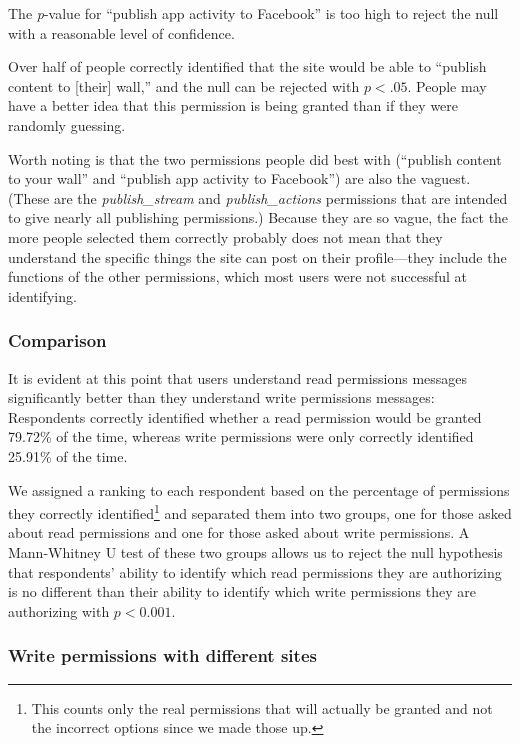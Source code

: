 \documentclass[10pt]{sig-alternate-10pt}
\begin{document}
The \emph{p}-value for ``publish app activity to Facebook'' is too high to reject the null with a reasonable level of confidence. 

Over half of people correctly identified that the site would be able to ``publish content to [their] wall,'' and the null can be rejected with $p < .05$. People may have a better idea that this permission is being granted than if they were randomly guessing. 

Worth noting is that the two permissions people did best with (``publish content to your wall'' and ``publish app activity to Facebook'') are also the vaguest. (These are the \emph{publish\_stream} and \emph{publish\_actions} permissions that are intended to give nearly all publishing permissions.) Because they are so vague, the fact the more people selected them correctly probably does not mean that they understand the specific things the site can post on their profile---they include the functions of the other permissions, which most users were not successful at identifying.

\subsubsection{Comparison}

It is evident at this point that users understand read permissions messages significantly better than they understand write permissions messages: Respondents correctly identified whether a read permission would be granted 79.72\% of the time, whereas write permissions were only correctly identified 25.91\% of the time.

We assigned a ranking to each respondent based on the percentage of permissions they correctly identified\footnote{This counts only the real permissions that will actually be granted and not the incorrect options since we made those up.} and separated them into two groups, one for those asked about read permissions and one for those asked about write permissions.  A Mann-Whitney U test of these two groups allows us to reject the null hypothesis that respondents’ ability to identify which read permissions they are authorizing is no different than their ability to identify which write permissions they are authorizing with $p < 0.001$.

\subsubsection{Write permissions with different sites}
\end{document}
